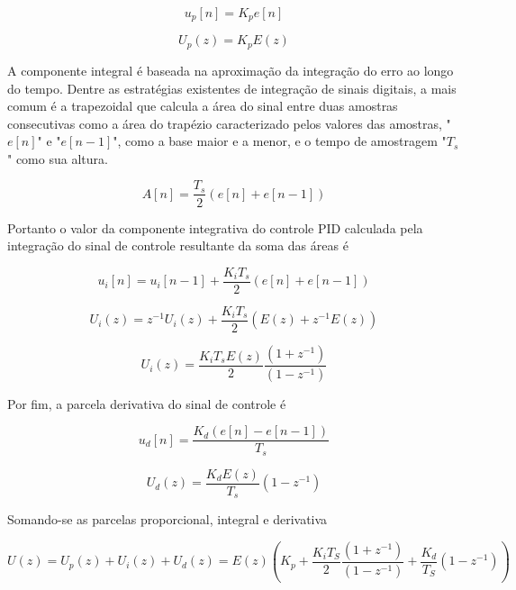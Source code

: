\begin{equation}
    \label{eq:cd_6}
    u_p[n] = K_pe[n]
\end{equation}

\begin{equation}
    \label{eq:cd_6.1}
    U_p(z) = K_pE(z)
\end{equation}

A componente integral é baseada na aproximação da integração do erro ao longo do tempo. Dentre as estratégias existentes de integração de sinais digitais, a mais comum é a trapezoidal que calcula a área do sinal entre duas amostras consecutivas como a área do trapézio caracterizado pelos valores das amostras, "$e[n]$" e "$e[n-1]$", como a base maior e a menor, e o tempo de amostragem "$T_s$" como sua altura.

\begin{equation}
    \label{eq:cd_7}
    A[n] = \frac{T_s}{2} (e[n]+e[n-1])
\end{equation}

Portanto o valor da componente integrativa do controle PID calculada pela integração do sinal de controle resultante da soma das áreas é

\begin{equation}
    \label{eq:cd_8}
    u_i[n] = u_i[n-1] + \frac{K_iT_s}{2} (e[n]+e[n-1])
\end{equation}


\begin{equation}
    \label{eq:cd_8.1}
    U_i(z) = z^{-1}U_i(z) + \frac{K_iT_s}{2} (E(z)+z^{-1}E(z))
\end{equation}

\begin{equation}
    \label{eq:cd_8.2}
    U_i(z) =\frac{K_iT_sE(z)}{2} \frac{(1+z^{-1})}{(1-z^{-1})}
\end{equation}

Por fim, a parcela derivativa do sinal de controle é

\begin{equation}
    \label{eq:cd_9}
    u_d[n] = \frac{K_d(e[n]-e[n-1])}{T_s}
\end{equation}

\begin{equation}
    \label{eq:cd_9.1}
    U_d(z) = \frac{K_dE(z)}{T_s} (1-z^{-1})
\end{equation}

Somando-se as parcelas proporcional, integral e derivativa

\begin{equation}
    \label{eq:cd_10}
    U(z) = U_p(z) + U_i(z) + U_d(z) = E(z)\left(K_p+\frac{K_iT_S}{2} \frac{(1+z^{-1})}{(1-z^{-1})} + \frac{K_d}{T_S}(1-z^{-1})\right)
\end{equation}

